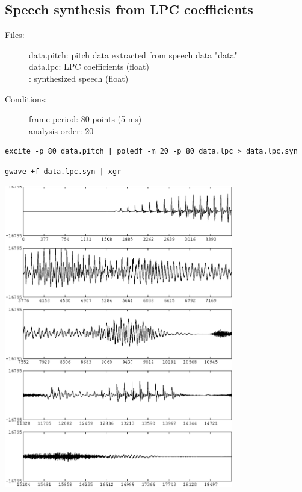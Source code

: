 \documentclass[a4paper,10pt]{article}
\begin{document}
\subsection{Speech synthesis from LPC coefficients}

\begin{description}
\item[Files:]
   data.pitch: pitch data extracted from speech data "data"\\
   data.lpc: LPC coefficients (float)\\
: 
   synthesized speech (float)
\item[Conditions:]
  frame period: 80 points (5 ms)\\
  analysis order: 20
\end{description}

\begin{verbatim}
excite -p 80 data.pitch | poledf -m 20 -p 80 data.lpc > data.lpc.syn
\end{verbatim}

\begin{verbatim}
gwave +f data.lpc.syn | xgr
\end{verbatim}

\includegraphics[width=10cm]{eps/data.lpc.syn.gwave.eps}
\end{document}
